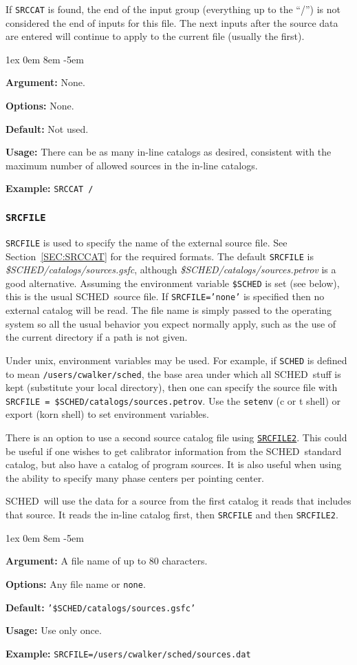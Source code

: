 \documentclass{report}
\newcommand{\schedb}{{\sc SCHED~}}
\newcommand{\rcwbox}[5]{
  \begin{list}{}{\parsep 1ex  \itemsep 0em
                 \leftmargin 8em  \itemindent -5em }
    \item {\bf Argument:} #1
    \item {\bf Options:}  #2
    \item {\bf Default:}  #3
    \item {\bf Usage:}    #4
    \item {\bf Example:}  #5
  \end{list}
}
\begin{document}
If {\tt SRCCAT}
is found, the end of the input group (everything up to the ``/'')
is not considered the end of inputs for this file.  The next inputs
after the source data are entered will continue to apply to the current
file (usually the first).

\rcwbox
{None.}
{None.}
{Not used.}
{There can be as many in-line catalogs as desired, consistent with
the maximum number of allowed sources in the in-line catalogs.}
{{\tt SRCCAT /}}


\subsubsection{\label{MP:SRCFILE}{\tt SRCFILE}}

{\tt SRCFILE} is used to specify the name of the external source
file. See Section~\ref{SEC:SRCCAT} for the required formats. The
default {\tt SRCFILE} is {\sl \$SCHED/catalogs/sources.gsfc}, although
{\sl \$SCHED/catalogs/sources.petrov} is a good alternative.
Assuming the environment variable {\tt \$SCHED} is set (see below),
this is the usual \schedb source file.  If {\tt SRCFILE='none'} is
specified then no external catalog will be read.  The file name is
simply passed to the operating system so all the usual behavior you
expect normally apply, such as the use of the current directory if a
path is not given.

Under unix, environment variables may be used.  For example, if
{\tt SCHED} is defined to mean {\tt /users/cwalker/sched}, the
base area under which all \schedb stuff is kept (substitute your
local directory), then one can specify the source file with
{\tt SRCFILE = \$SCHED/catalogs/sources.petrov}.  Use the {\tt setenv}
(c or t shell) or export (korn shell) to set environment variables.

There is an option to use a second source catalog file using
{\hyperref[MP:SRCFILE2]{{\tt SRCFILE2}}}.  This could be useful if one
wishes to get calibrator information from the \schedb standard
catalog, but also have a catalog of program sources.  It is also
useful when using the ability to specify many phase centers per
pointing center.

\schedb will use the data for a source from the first catalog it
reads that includes that source.  It reads the in-line catalog first,
then {\tt SRCFILE} and then {\tt SRCFILE2}.

\rcwbox
{A file name of up to 80 characters.}
{Any file name or {\tt none}.}
{{\tt '\$SCHED/catalogs/sources.gsfc'}}
{Use only once.}
{{\tt SRCFILE=/users/cwalker/sched/sources.dat}}
\end{document}
